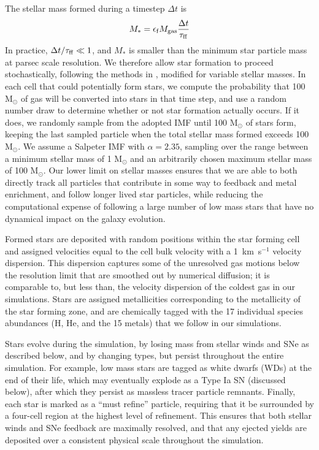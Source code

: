 \documentclass[twocolumn]{aastex61}
\begin{document}
The stellar mass formed during a timestep $\Delta t$ is
\begin{equation}
         M_* = \epsilon_{\rm f} M_{\rm gas} \frac{\Delta t}{\tau_{\rm ff}}
\end{equation}
In practice, $\Delta t/\tau_{\rm ff} \ll 1$, and $M_*$ is smaller than the minimum star particle mass at parsec scale resolution. We therefore allow star formation to proceed stochastically, following the methods in \citet{Goldbaum2015, Goldbaum2016}, modified for variable stellar masses. In each cell that could potentially form stars, we compute the probability that 100 M$_{\odot}$ of gas will be converted into stars in that time step, and use a random number draw to determine whether or not star formation actually occurs. If it does, we randomly sample from
the adopted IMF until 100 M$_{\odot}$ of stars form, keeping the last sampled particle when the total stellar mass formed exceeds 100 M$_{\odot}$. We assume a Salpeter IMF \citep{Salpeter1955} with $\alpha = 2.35$, sampling over the range between a minimum stellar mass of 1 M$_{\odot}$ and an arbitrarily chosen maximum stellar mass of 100 M$_{\odot}$. Our lower limit on stellar masses ensures that we are able to both directly track all particles that contribute in some way to feedback and metal enrichment, and follow longer lived star particles, while reducing the computational expense of following a large number of low mass stars that have no dynamical impact on the galaxy evolution.

Formed stars are deposited with random positions within the star forming cell and assigned velocities equal to the cell bulk velocity with a 1~km~s$^{-1}$ velocity dispersion. This dispersion captures some of the unresolved gas motions below the resolution limit that are smoothed out by numerical diffusion; it is comparable to, but less than, the velocity dispersion of the coldest gas in our simulations. Stars are assigned metallicities corresponding to the metallicity of the star forming zone, and are chemically tagged with the 17 individual species abundances (H, He, and the 15 metals) that we follow in our simulations. 

Stars evolve during the simulation, by losing mass from stellar winds and SNe as described below, and by changing types, but persist throughout the entire simulation. For example, low mass stars are tagged as white dwarfs (WDs) at the end of their life, which may eventually explode as a Type Ia SN (discussed below), after which they persist as massless tracer particle remnants. Finally, each star is marked as a ``must refine'' particle, requiring that it be surrounded by a four-cell region at the highest level of refinement. This ensures that both stellar winds and SNe feedback are maximally resolved, and that any ejected yields are deposited over a consistent physical scale throughout the simulation.
\end{document}
